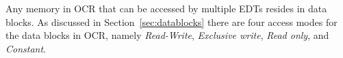 Any memory in OCR that can be accessed by multiple EDTs resides in data blocks.  As
discussed in Section~\ref{sec:datablocks} there
are four access modes for the data blocks in OCR, namely \emph{Read-Write},
\emph{Exclusive write}, \emph{Read only}, and \emph{Constant}.
\begin{comment}
The modes and how they
interact with the OCR memory model are listed as follows.
\begin{itemize}

\item \emph{Read-Write} (default mode)\index{Data block, read-write}:
  The EDT may read and write to the data block. Multiple EDTs may
  write to the same data block at the same time with values
  constrained according to the rules in the OCR memory model.

\item \emph{Exclusive write}\index{Data block, exclusive write}: The
  EDT requires that it is the only EDT that can commit write
  operations to a data block at a given time. Writes must follow a
  sequential total order; i.e.\ when more than one EDT is writing
  to a data block in exclusive write mode, all the writes from one EDT
  must complete before a subsequent EDT can acquire and then write to
  the data block. This serializes the execution of
  EDTs that acquire a same data block in exclusive write mode.

\item \emph{Read only}\index{Data block, read only}: The EDT
  will only read from the data block. OCR does
  not restrict the ability of other EDTs to write to the data block. The
  visibility of those writes are undefined; i.e.\ an implementation may
  choose whether or not to make writes by other EDTs visible.

\item \emph{Constant}\index{Data Block,constant}: The EDT will
  only read from the data block and the OCR runtime will ensure
  that once the data block is acquired, writes from other EDTs
  will not be visible.

\end{itemize}
\end{comment}


